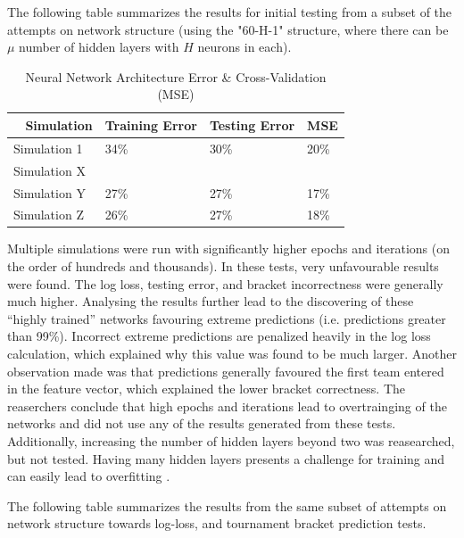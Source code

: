 \documentclass[conference]{IEEEtran}
\begin{document}
{The following table summarizes the results for initial testing from a subset of the attempts on network structure (using the "60-H-1" structure, where there can be $\mu$ number of hidden layers with $H$ neurons in each).

\begin{table}[H]
	\centering
    \begin{tabular}{|l|l|l|l|}
    \hline
    ~   \textbf{Simulation} & \textbf{Training Error} & \textbf{Testing Error} & \textbf{MSE}\\ \hline
    Simulation 1 & 34\% & 30\% & 20\% \\ \hline
    Simulation X & ~ & ~ & ~ \\ \hline %
    Simulation Y & 27\% & 27\% & 17\% \\ \hline %
    Simulation Z & 26\% & 27\% & 18\% \\ \hline %
    \end{tabular}
    \caption {Neural Network Architecture Error \& Cross-Validation (MSE)}
    \label{tab:nn-error}
\end{table}

Multiple simulations were run with significantly higher epochs and iterations (on the order of hundreds and thousands). 
In these tests, very unfavourable results were found. 
The log loss, testing error, and bracket incorrectness were generally much higher.
Analysing the results further lead to the discovering of these ``highly trained'' networks favouring extreme predictions (i.e. predictions greater than 99\%).
Incorrect extreme predictions are penalized heavily in the log loss calculation, which explained why this value was found to be much larger.
Another observation made was that predictions generally favoured the first team entered in the feature vector, which explained the lower bracket correctness.
The reaserchers conclude that high epochs and iterations lead to overtrainging of the networks and did not use any of the results generated from these tests.
Additionally, increasing the number of hidden layers beyond two was reasearched, but not tested.
Having many hidden layers presents a challenge for training and can easily lead to overfitting \cite{bengio2007scaling}.

The following table summarizes the results from the same subset of attempts on network structure towards log-loss, and tournament bracket prediction tests.

}
\end{document}
